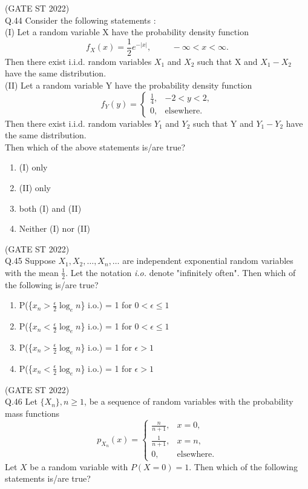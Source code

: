 \documentclass[journal,12pt,onecolumn]{IEEEtran}
\theoremstyle{remark}
\begin{document}
\hfill (GATE ST 2022)\\
	\vspace{2em}
Q.44 Consider the following statements :\\
(I) Let a random variable X have the probability density function 
\[
f_X(x) = \frac{1}{2}e^{-|x|}, \hspace{1cm} -\infty < x < \infty.
\]
Then there exist i.i.d. random variables $X_1$ and $X_2$ such that X and $X_1 - X_2$ have the same distribution. \\
(II) Let a random variable Y have the probability density function 
\[
f_Y(y) = \begin{cases}
	\frac{1}{4}, & -2 < y < 2,\\
	0, & \text{elsewhere}.
\end{cases}
\]
Then there exist i.i.d. random variables $Y_1$ and $Y_2$ such that Y and $Y_1 - Y_2$ have the same distribution.\\
Then which of the above statements is/are true?
\begin{multicols}{4}
\begin{enumerate}[label=\Alph*.] 
	\item (I) only
	\item (II) only
	\item both (I) and (II)
	\item Neither (I) nor (II)

\end{enumerate}
\end{multicols}
\hfill (GATE ST 2022)\\
	\vspace{2em}
Q.45 Suppose \(X_1, X_2, \ldots, X_n, \ldots\) are independent exponential random variables with the mean \(\frac{1}{2}\). Let the notation \emph{i.o.} denote "infinitely often". Then which of the following is/are true?
\begin{multicols}{2}
\begin{enumerate}[label=\alph*.] 
	\item P(\{$x_n > \frac{\epsilon}{2}\log_en$\} i.o.) = 1 for $0 < \epsilon \leq 1$
	\item P(\{$x_n < \frac{\epsilon}{2}\log_en$\} i.o.) = 1 for $0 < \epsilon \leq 1$
	\item P(\{$x_n > \frac{\epsilon}{2}\log_en$\} i.o.) = 1 for $\epsilon > 1$
	\item P(\{$x_n < \frac{\epsilon}{2}\log_en$\} i.o.) = 1 for $\epsilon > 1$

\end{enumerate}
\end{multicols}
\hfill (GATE ST 2022)\\
	\vspace{2em}
Q.46 Let \(\{X_n\}, n \ge 1\), be a sequence of random variables with the probability mass functions
\[
p_{X_n}(x) = 
\begin{cases}
	\frac{n}{n+1}, & x = 0, \\[6pt]
	\frac{1}{n+1}, & x = n, \\[6pt]
	0, & \text{elsewhere}.
\end{cases}
\]
Let \(X\) be a random variable with \(P(X=0)=1\). Then which of the following statements is/are true?
\end{document}
